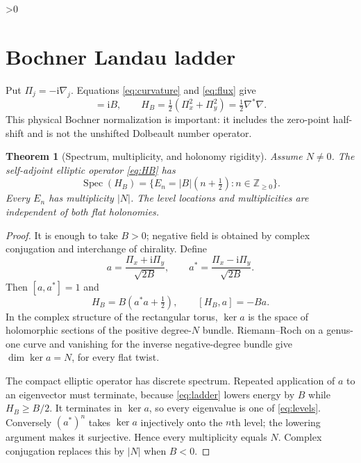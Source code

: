 \documentclass[10pt]{article}
\newcommand{\ZZ}{\mathbb Z}
\newcommand{\ii}{\mathrm i}
\newtheorem{theorem}{Theorem}
\begin{document}
\ifnum\CRevisionRound>0
\section{Bochner Landau ladder}

Put $\Pi_j=-\ii\nabla_j$.  Equations \eqref{eq:curvature} and
\eqref{eq:flux} give
\begin{equation}
 [\Pi_x,\Pi_y]=\ii B,
 \qquad H_B=\tfrac12(\Pi_x^2+\Pi_y^2)=\tfrac12\nabla^*\nabla. \label{eq:HB}
\end{equation}
This physical Bochner normalization is important: it includes the
zero-point half-shift and is not the unshifted Dolbeault number operator.

\begin{theorem}[Spectrum, multiplicity, and holonomy rigidity]
Assume $N\ne0$.  The self-adjoint elliptic operator \eqref{eq:HB} has
\begin{equation}
 \operatorname{Spec}(H_B)=
 \{E_n=|B|(n+\tfrac12):n\in\ZZ_{\ge0}\}.         \label{eq:levels}
\end{equation}
Every $E_n$ has multiplicity $|N|$.  The level locations and
multiplicities are independent of both flat holonomies.
\end{theorem}

\begin{proof}
It is enough to take $B>0$; negative field is obtained by complex
conjugation and interchange of chirality.  Define
\[
 a=\frac{\Pi_x+\ii\Pi_y}{\sqrt{2B}},\qquad
 a^*=\frac{\Pi_x-\ii\Pi_y}{\sqrt{2B}}.
\]
Then $[a,a^*]=1$ and
\begin{equation}
 H_B=B(a^*a+\tfrac12),\qquad [H_B,a]=-Ba.         \label{eq:ladder}
\end{equation}
In the complex structure of the rectangular torus, $\ker a$ is the space
of holomorphic sections of the positive degree-$N$ bundle.  Riemann--Roch
on a genus-one curve and vanishing for the inverse negative-degree bundle
give $\dim\ker a=N$, for every flat twist.

The compact elliptic operator has discrete spectrum.  Repeated application
of $a$ to an eigenvector must terminate, because \eqref{eq:ladder} lowers
energy by $B$ while $H_B\ge B/2$.  It terminates in $\ker a$, so every
eigenvalue is one of \eqref{eq:levels}.  Conversely $(a^*)^n$ takes
$\ker a$ injectively onto the $n$th level; the lowering argument makes it
surjective.  Hence every multiplicity equals $N$.  Complex conjugation
replaces this by $|N|$ when $B<0$.
\end{proof}
\end{document}
